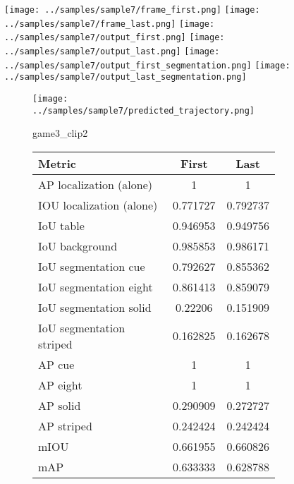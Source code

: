\begin{figure}
    \texttt{[image: ../samples/sample7/frame\_first.png]}
    \texttt{[image: ../samples/sample7/frame\_last.png]}
    \newline
    \texttt{[image: ../samples/sample7/output\_first.png]}
    \texttt{[image: ../samples/sample7/output\_last.png]}
    \newline
    \texttt{[image: ../samples/sample7/output\_first\_segmentation.png]}
    \texttt{[image: ../samples/sample7/output\_last\_segmentation.png]}
    \newline
    \begin{subfigure}[b]{0.49\textwidth}
        \vspace{20pt}
        \texttt{[image: ../samples/sample7/predicted\_trajectory.png]}
        \caption*{game3\_clip2}
    \end{subfigure}
\begin{subfigure}[b]{0.49\textwidth}
    \begin{tabular}{|l|c|c|}
        \hline
        \textbf{Metric} & \textbf{First} & \textbf{Last} \\
        \hline
        AP localization (alone) & 1 & 1 \\ 
        IOU localization (alone) & 0.771727 & 0.792737 \\ 
        \hline
        IoU table & 0.946953 & 0.949756 \\ 
        IoU background & 0.985853 & 0.986171 \\ 
        \hline
        IoU segmentation cue & 0.792627 & 0.855362 \\ 
        IoU segmentation eight & 0.861413 & 0.859079 \\ 
        IoU segmentation solid & 0.22206 & 0.151909 \\ 
        IoU segmentation striped & 0.162825 & 0.162678 \\ 
        \hline
        AP cue & 1 & 1 \\ 
        AP eight & 1 & 1 \\ 
        AP solid & 0.290909 & 0.272727 \\ 
        AP striped & 0.242424 & 0.242424 \\ 
        \hline
        mIOU & 0.661955 & 0.660826 \\ 
        mAP & 0.633333 & 0.628788 \\ 
        \hline
    \end{tabular} 
\end{subfigure}
\end{figure}

